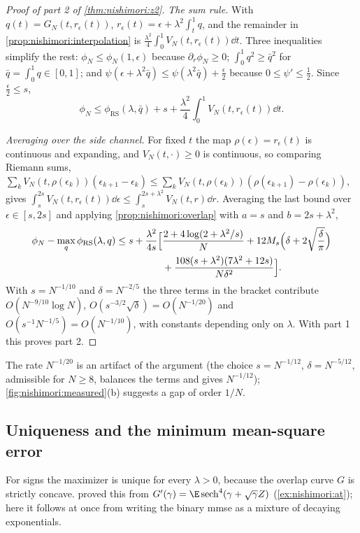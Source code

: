 \begin{refsection}
\begin{proof}[Proof of part 2 of \cref{thm:nishimori:z2}]
\emph{The sum rule.} With $q(t)=G_N(t,r_\epsilon(t))$, $r_\epsilon(t)=\epsilon+\lambda^2\int_t^1q$, and the remainder in \cref{prop:nishimori:interpolation} is $\frac{\lambda^2}4\int_0^1V_N(t,r_\epsilon(t))\dd t$. Three inequalities simplify the rest: $\phi_N\le\phi_N(1,\epsilon)$ because $\partial_r\phi_N\ge0$; $\int_0^1q^2\ge\bar q^2$ for $\bar q=\int_0^1q\in[0,1]$; and $\psi(\epsilon+\lambda^2\bar q)\le\psi(\lambda^2\bar q)+\frac\epsilon2$ because $0\le\psi'\le\frac12$. Since $\frac\epsilon2\le s$,
\[
\phi_N\le\phi_{\mathrm{RS}}(\lambda,\bar q)+s+\frac{\lambda^2}4\int_0^1V_N(t,r_\epsilon(t))\dd t.
\]

\emph{Averaging over the side channel.} For fixed $t$ the map $\rho(\epsilon)=r_\epsilon(t)$ is continuous and expanding, and $V_N(t,\cdot)\ge0$ is continuous, so comparing Riemann sums, $\sum_kV_N(t,\rho(\epsilon_k))(\epsilon_{k+1}-\epsilon_k)\le\sum_kV_N(t,\rho(\epsilon_k))(\rho(\epsilon_{k+1})-\rho(\epsilon_k))$, gives $\int_s^{2s}V_N(t,r_\epsilon(t))\dd\epsilon\le\int_s^{2s+\lambda^2}V_N(t,r)\dd r$. Averaging the last bound over $\epsilon\in[s,2s]$ and applying \cref{prop:nishimori:overlap} with $a=s$ and $b=2s+\lambda^2$,
\begin{align*}
\phi_N-\max_q\phi_{\mathrm{RS}}(\lambda,q)\le s+\frac{\lambda^2}{4s}\Bigl[&\frac{2+4\log(2+\lambda^2/s)}N+12M_s\Bigl(\delta+2\sqrt{\frac\delta\pi}\Bigr)\\
&+\frac{108(s+\lambda^2)(7\lambda^2+12s)}{N\delta^2}\Bigr].
\end{align*}
With $s=N^{-1/10}$ and $\delta=N^{-2/5}$ the three terms in the bracket contribute $O(N^{-9/10}\log N)$, $O(s^{-3/2}\sqrt\delta)=O(N^{-1/20})$ and $O(s^{-1}N^{-1/5})=O(N^{-1/10})$, with constants depending only on $\lambda$. With part 1 this proves part 2.
\end{proof}

The rate $N^{-1/20}$ is an artifact of the argument (the choice $s=N^{-1/12}$, $\delta=N^{-5/12}$, admissible for $N\ge8$, balances the terms and gives $N^{-1/12}$); \cref{fig:nishimori:measured}(b) suggests a gap of order $1/N$.

\subsection{Uniqueness and the minimum mean-square error}\label{sec:nishimori:mmse}

For signs the maximizer is unique for every $\lambda>0$, because the overlap curve $G$ is strictly concave. \Textcite[\S3 and App.~B.2]{DeshpandeAbbeMontanari2016} proved this from $G'(\gamma)=\E\operatorname{sech}^4(\gamma+\sqrt\gamma Z)$ (\cref{ex:nishimori:at}); here it follows at once from writing the binary mmse as a mixture of decaying exponentials.


\end{refsection}
